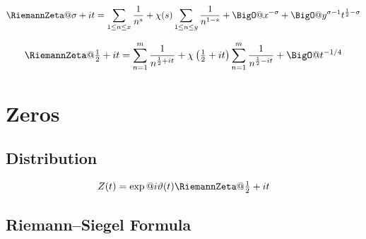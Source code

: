 \documentclass{article}
\begin{document}
\begin{equation}\label{eq:ZE.APP.APP1}
  \RiemannZeta@{\sigma+\iunit t}
  = \sum_{1 \leq n \leq x} \frac{1}{n^s}
  + \chi(s) \sum_{1 \leq n \leq y} \frac{1}{n^{1-s}}
  + \BigO@{x^{-\sigma}}
  + \BigO@{y^{\sigma-1} t^{\frac{1}{2} - \sigma}}
\end{equation}

\begin{equation}\label{eq:ZE.APP.APP3}
  \RiemannZeta@{\tfrac{1}{2}+\iunit t}
  = \sum_{n=1}^m \frac{1}{n^{\frac{1}{2}+\iunit t}}
  + \chi\left( \tfrac{1}{2}+\iunit t \right)
    \sum_{n=1}^m \frac{1}{n^{\frac{1}{2}-\iunit t}}
  + \BigO@{t^{-1/4}}
\end{equation}

\section{Zeros}\label{sec:ZE.ZERO}

\subsection{Distribution}\label{sec:ZE.ZERO.DIST}
 

\begin{equation}\label{eq:ZE.ZERO.DIST1}
  Z(t) = \exp@{\iunit \vartheta(t)} \RiemannZeta@{\tfrac{1}{2}+\iunit t}
\end{equation}

\subsection{Riemann--Siegel Formula}\label{sec:ZE.ZERO.RS}
\end{document}
